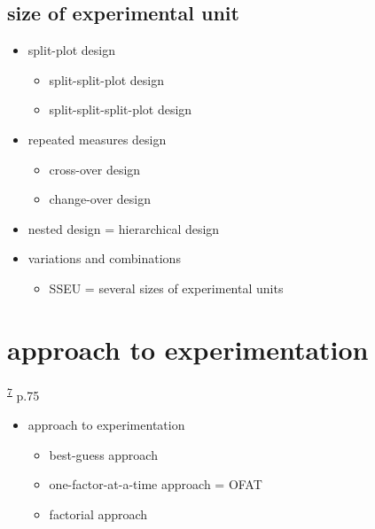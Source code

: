 \documentclass[
]{book}
\providecommand{\tightlist}{%
  \setlength{\itemsep}{0pt}\setlength{\parskip}{0pt}}
\theoremstyle{definition}
\theoremstyle{definition}
\theoremstyle{definition}
\theoremstyle{definition}
\theoremstyle{remark}
\begin{document}
\hypertarget{size-of-experimental-unit}{%
\subsection{size of experimental unit}\label{size-of-experimental-unit}}

\begin{itemize}
\tightlist
\item
  split-plot design

  \begin{itemize}
  \tightlist
  \item
    split-split-plot design
  \item
    split-split-split-plot design
  \end{itemize}
\item
  repeated measures design

  \begin{itemize}
  \tightlist
  \item
    cross-over design
  \item
    change-over design
  \end{itemize}
\item
  nested design = hierarchical design
\item
  variations and combinations

  \begin{itemize}
  \tightlist
  \item
    SSEU = several sizes of experimental units
  \end{itemize}
\end{itemize}

\hypertarget{approach-to-experimentation}{%
\section{approach to experimentation}\label{approach-to-experimentation}}

\textsuperscript{\protect\hyperlink{ref-hu2022}{7}} p.75

\begin{itemize}
\tightlist
\item
  approach to experimentation

  \begin{itemize}
  \tightlist
  \item
    best-guess approach
  \item
    one-factor-at-a-time approach = OFAT
  \item
    factorial approach
  \end{itemize}
\end{itemize}
\end{document}
